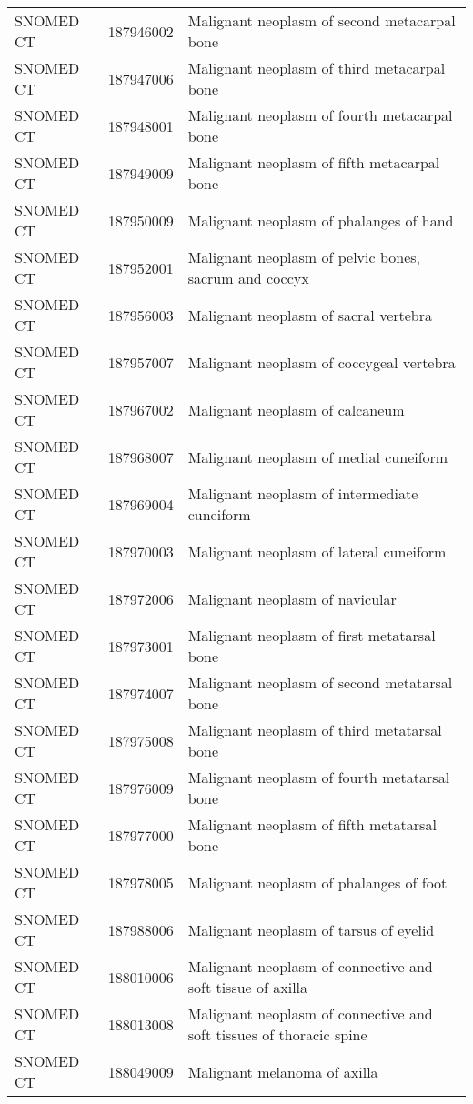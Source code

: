 \begin{longtable}{p{}p{}p{}}
  SNOMED CT & 187946002 & Malignant neoplasm of second metacarpal bone \\ 
  SNOMED CT & 187947006 & Malignant neoplasm of third metacarpal bone \\ 
  SNOMED CT & 187948001 & Malignant neoplasm of fourth metacarpal bone \\ 
  SNOMED CT & 187949009 & Malignant neoplasm of fifth metacarpal bone \\ 
  SNOMED CT & 187950009 & Malignant neoplasm of phalanges of hand \\ 
  SNOMED CT & 187952001 & Malignant neoplasm of pelvic bones, sacrum and coccyx \\ 
  SNOMED CT & 187956003 & Malignant neoplasm of sacral vertebra \\ 
  SNOMED CT & 187957007 & Malignant neoplasm of coccygeal vertebra \\ 
  SNOMED CT & 187967002 & Malignant neoplasm of calcaneum \\ 
  SNOMED CT & 187968007 & Malignant neoplasm of medial cuneiform \\ 
  SNOMED CT & 187969004 & Malignant neoplasm of intermediate cuneiform \\ 
  SNOMED CT & 187970003 & Malignant neoplasm of lateral cuneiform \\ 
  SNOMED CT & 187972006 & Malignant neoplasm of navicular \\ 
  SNOMED CT & 187973001 & Malignant neoplasm of first metatarsal bone \\ 
  SNOMED CT & 187974007 & Malignant neoplasm of second metatarsal bone \\ 
  SNOMED CT & 187975008 & Malignant neoplasm of third metatarsal bone \\ 
  SNOMED CT & 187976009 & Malignant neoplasm of fourth metatarsal bone \\ 
  SNOMED CT & 187977000 & Malignant neoplasm of fifth metatarsal bone \\ 
  SNOMED CT & 187978005 & Malignant neoplasm of phalanges of foot \\ 
  SNOMED CT & 187988006 & Malignant neoplasm of tarsus of eyelid \\ 
  SNOMED CT & 188010006 & Malignant neoplasm of connective and soft tissue of axilla \\ 
  SNOMED CT & 188013008 & Malignant neoplasm of connective and soft tissues of thoracic spine \\ 
  SNOMED CT & 188049009 & Malignant melanoma of axilla \\ 

\end{longtable}
